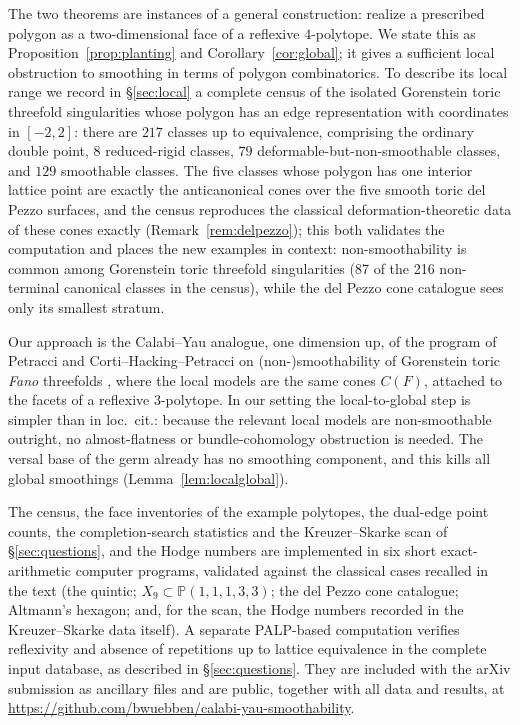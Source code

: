 \documentclass[11pt]{amsart}
\theoremstyle{definition}
\theoremstyle{remark}
\newcommand{\PP}{\mathbb{P}}
\begin{document}
The two theorems are instances of a general construction: realize a
prescribed polygon as a two-dimensional face of a reflexive $4$-polytope.
We state this as Proposition~\ref{prop:planting} and
Corollary~\ref{cor:global}; it
gives a sufficient local obstruction to smoothing in terms of polygon
combinatorics.  To describe its local range
we record in \S\ref{sec:local} a complete census of the isolated Gorenstein
toric threefold singularities whose polygon has an edge representation with
coordinates in $[-2,2]$: there are $217$ classes up to equivalence,
comprising the ordinary double point, $8$ reduced-rigid classes,
$79$ deformable-but-non-smoothable
classes, and $129$ smoothable classes.  The five classes whose polygon has one
interior lattice point are exactly the anticanonical cones over the five
smooth toric del Pezzo surfaces, and the census reproduces the classical
deformation-theoretic data of these cones \cite[\S5.5]{Gross97} exactly
(Remark~\ref{rem:delpezzo}); this both validates the computation and places
the new examples in context: non-smoothability is common among Gorenstein
toric threefold singularities (87 of the 216 non-terminal canonical classes
in the census),
while the del Pezzo cone catalogue sees only its smallest stratum.

Our approach is the Calabi--Yau analogue, one dimension up, of the program of
Petracci and Corti--Hacking--Petracci on (non-)smoothability of Gorenstein
toric \emph{Fano} threefolds \cite{Petracci20,CHP24}, where the local models
are the same cones $C(F)$, attached to the facets of a reflexive
$3$-polytope.  In our setting the local-to-global step is simpler than in
loc.~cit.: because the relevant local models are non-smoothable outright, no
almost-flatness or bundle-cohomology obstruction is needed.  The versal base
of the germ already has no smoothing component, and this kills all global
smoothings (Lemma~\ref{lem:localglobal}).

The census, the face inventories of the
example polytopes, the dual-edge point counts, the completion-search
statistics and
the Kreuzer--Skarke scan of \S\ref{sec:questions}, and the Hodge numbers are
implemented in six short exact-arithmetic computer programs, validated
against the classical cases recalled in the text (the quintic; $X_9 \subset
\PP(1,1,1,3,3)$; the del Pezzo cone catalogue; Altmann's hexagon; and, for
the scan, the Hodge numbers recorded in the Kreuzer--Skarke data itself).
A separate PALP-based computation verifies reflexivity and absence of
repetitions up to lattice equivalence in the complete input database,
as described in \S\ref{sec:questions}.
They are included with the arXiv submission as ancillary files and are
public, together with all data and results, at
\url{https://github.com/bwuebben/calabi-yau-smoothability}.
\end{document}
